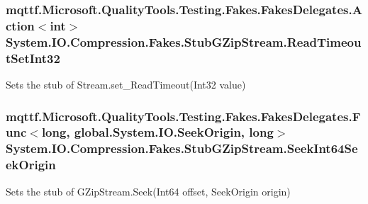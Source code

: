 \hypertarget{class_system_1_1_i_o_1_1_compression_1_1_fakes_1_1_stub_g_zip_stream_ae8089da09446167858d55c5f25d6d998}{
\subsubsection[{Read\-Timeout\-Set\-Int32}]{\setlength{\rightskip}{0pt plus 5cm}mqttf.\-Microsoft.\-Quality\-Tools.\-Testing.\-Fakes.\-Fakes\-Delegates.\-Action$<$int$>$ System.\-I\-O.\-Compression.\-Fakes.\-Stub\-G\-Zip\-Stream.\-Read\-Timeout\-Set\-Int32}}\label{class_system_1_1_i_o_1_1_compression_1_1_fakes_1_1_stub_g_zip_stream_ae8089da09446167858d55c5f25d6d998}


Sets the stub of Stream.\-set\-\_\-\-Read\-Timeout(\-Int32 value)

\hypertarget{class_system_1_1_i_o_1_1_compression_1_1_fakes_1_1_stub_g_zip_stream_a648da6739fd293c10e50ec9201888c67}{
\subsubsection[{Seek\-Int64\-Seek\-Origin}]{\setlength{\rightskip}{0pt plus 5cm}mqttf.\-Microsoft.\-Quality\-Tools.\-Testing.\-Fakes.\-Fakes\-Delegates.\-Func$<$long, global.\-System.\-I\-O.\-Seek\-Origin, long$>$ System.\-I\-O.\-Compression.\-Fakes.\-Stub\-G\-Zip\-Stream.\-Seek\-Int64\-Seek\-Origin}}\label{class_system_1_1_i_o_1_1_compression_1_1_fakes_1_1_stub_g_zip_stream_a648da6739fd293c10e50ec9201888c67}


Sets the stub of G\-Zip\-Stream.\-Seek(\-Int64 offset, Seek\-Origin origin)

